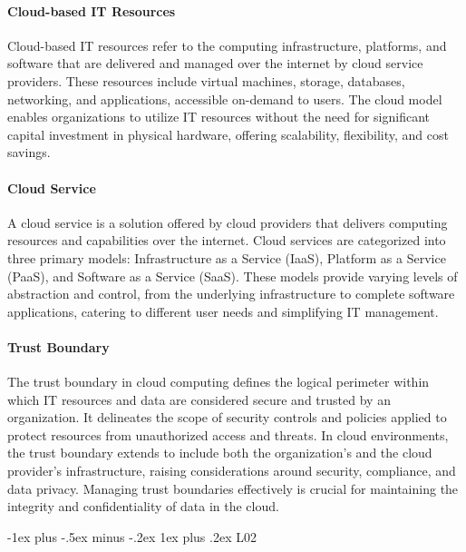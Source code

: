\documentclass[10pt, landscape]{article}
\makeatletter
\renewcommand{\subsubsection}{\@startsection{subsubsection}{3}{0mm}%
  {-1ex plus -.5ex minus -.2ex}%
  {1ex plus .2ex}%
{\normalfont\small\bfseries}}%
\makeatother
\begin{document}
\begin{multicols*}{4}
\paragraph{Cloud-based IT Resources}\label{cloud-based-it-resources}

Cloud-based IT resources refer to the computing infrastructure,
platforms, and software that are delivered and managed over the internet
by cloud service providers. These resources include virtual machines,
storage, databases, networking, and applications, accessible on-demand
to users. The cloud model enables organizations to utilize IT resources
without the need for significant capital investment in physical
hardware, offering scalability, flexibility, and cost savings.

\paragraph{Cloud Service}\label{cloud-service}

A cloud service is a solution offered by cloud providers that delivers
computing resources and capabilities over the internet. Cloud services
are categorized into three primary models: Infrastructure as a Service
(IaaS), Platform as a Service (PaaS), and Software as a Service (SaaS).
These models provide varying levels of abstraction and control, from the
underlying infrastructure to complete software applications, catering to
different user needs and simplifying IT management.

\paragraph{Trust Boundary}\label{trust-boundary}

The trust boundary in cloud computing defines the logical perimeter
within which IT resources and data are considered secure and trusted by
an organization. It delineates the scope of security controls and
policies applied to protect resources from unauthorized access and
threats. In cloud environments, the trust boundary extends to include
both the organization's and the cloud provider's infrastructure, raising
considerations around security, compliance, and data privacy. Managing
trust boundaries effectively is crucial for maintaining the integrity
and confidentiality of data in the cloud.

\subsubsection{L02}\label{l02}


\end{multicols*}
\end{document}
